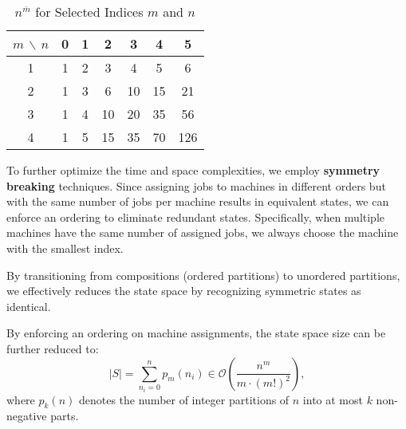 \begin{table}
    \centering
    \begin{tabular}{c|cccccc}
        \hline
        \textbf{\(m\)} $\backslash$ \textbf{\(n\)} & \textbf{0} & \textbf{1} & \textbf{2} & \textbf{3} & \textbf{4} & \textbf{5} \\
        \hline
        1                                          & 1          & 2          & 3          & 4          & 5          & 6          \\
        2                                          & 1          & 3          & 6          & 10         & 15         & 21         \\
        3                                          & 1          & 4          & 10         & 20         & 35         & 56         \\
        4                                          & 1          & 5          & 15         & 35         & 70         & 126        \\
        \hline
    \end{tabular}
    \label{tab:sss-merged-successors}
    \caption{\( n^{\overline{m}} \) for Selected Indices \(m\) and \(n\)}
\end{table}

To further optimize the time and space complexities, we employ \textbf{symmetry breaking} techniques. Since assigning jobs to machines in different orders but with the same number of jobs per machine results in equivalent states, we can enforce an ordering to eliminate redundant states. Specifically, when multiple machines have the same number of assigned jobs, we always choose the machine with the smallest index.

By transitioning from compositions (ordered partitions) to unordered partitions, we effectively reduces the state space by recognizing symmetric states as identical.

\begin{lemma}
    \label{lemma:symmetry-breaking}
    By enforcing an ordering on machine assignments, the state space size can be further reduced to:
    \begin{equation}
        \label{eq:partition-sum}
        |S| = \sum_{n_i=0}^n p_m(n_i) \in \mathcal{O}\left( \frac{n^m}{m \cdot (m!)^2} \right),
    \end{equation}
    where $p_k(n)$ denotes the number of integer partitions of $n$ into at most $k$ non-negative parts.
\end{lemma}

